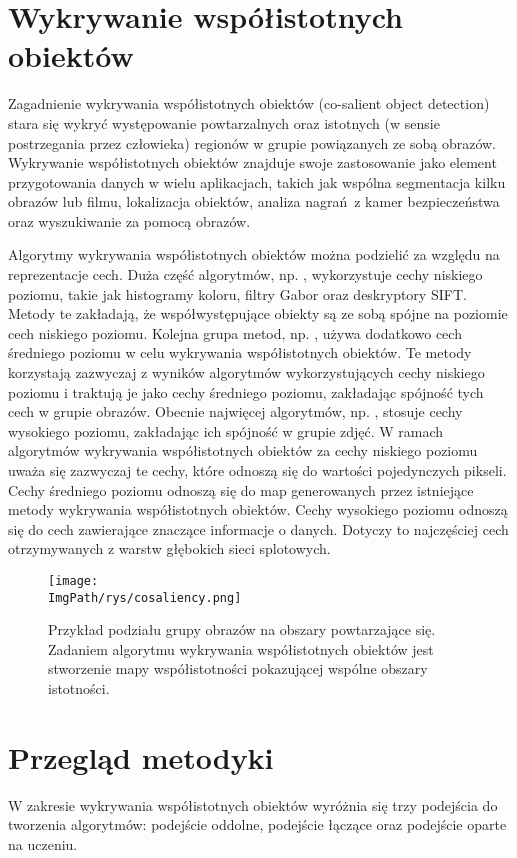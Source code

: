 \documentclass[a4paper,12pt,twoside,openany]{report}
\newcommand{\ImgPath}{.}
\begin{document}
	\section{Wykrywanie współistotnych obiektów}
	Zagadnienie wykrywania współistotnych obiektów (co-salient object detection) stara się wykryć występowanie powtarzalnych oraz istotnych (w sensie postrzegania przez człowieka) regionów w grupie powiązanych ze sobą obrazów. Wykrywanie współistotnych obiektów znajduje swoje zastosowanie jako element przygotowania danych w wielu aplikacjach, takich jak wspólna segmentacja kilku obrazów lub filmu, lokalizacja obiektów, analiza nagrań z kamer bezpieczeństwa oraz wyszukiwanie za pomocą obrazów. 

	Algorytmy wykrywania współistotnych obiektów można podzielić za względu na reprezentacje cech. Duża część algorytmów, np. \cite{ChangLL11}, wykorzystuje cechy niskiego poziomu, takie jak histogramy koloru, filtry Gabor oraz deskryptory SIFT. Metody te zakładają, że współwystępujące obiekty są ze sobą spójne na poziomie cech niskiego poziomu. Kolejna grupa metod, np. \cite{midfeatex}, używa dodatkowo cech średniego poziomu w celu wykrywania współistotnych obiektów. Te metody korzystają zazwyczaj z wyników algorytmów wykorzystujących cechy niskiego poziomu i traktują je jako cechy średniego poziomu, zakładając spójność tych cech w grupie obrazów. Obecnie najwięcej algorytmów, np. \cite{highfeatex}, stosuje cechy wysokiego poziomu, zakładając ich spójność w grupie zdjęć. W ramach algorytmów wykrywania współistotnych obiektów za cechy niskiego poziomu uważa się zazwyczaj te cechy, które odnoszą się do wartości pojedynczych pikseli. Cechy średniego poziomu odnoszą się do map generowanych przez istniejące metody wykrywania współistotnych obiektów. Cechy wysokiego poziomu odnoszą się do cech zawierające znaczące informacje o danych. Dotyczy to najczęściej cech otrzymywanych z warstw głębokich sieci splotowych. 
	

	\begin{figure}[h]
		\centering
		\texttt{[image: \\ImgPath/rys/cosaliency.png]}
		\caption{Przykład podziału grupy obrazów na obszary powtarzające się. Zadaniem algorytmu wykrywania współistotnych obiektów jest stworzenie mapy współistotności pokazującej wspólne obszary istotności.}
		\label{co}
	\end{figure}

	\section{Przegląd metodyki}
	W zakresie wykrywania współistotnych obiektów wyróżnia się trzy podejścia do tworzenia algorytmów: podejście oddolne, podejście łączące oraz podejście oparte na uczeniu.
\end{document}
